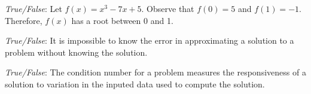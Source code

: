 \documentclass[11pt,letterpaper]{article}
\begin{document}
\thispagestyle{title}


\quizsol \textit{True/False}: Let $f(x)= x^3 - 7x + 5$. Observe that $f(0)= 5$ and $f(1)= -1$. Therefore, $f(x)$ has a root between 0 and 1. \pspace

\sol 


\quizsol \textit{True/False}: It is impossible to know the error in approximating a solution to a problem without knowing the solution. \pspace


\quizsol \textit{True/False}: The condition number for a problem measures the responsiveness of a solution to variation in the inputed data used to compute the solution. \pspace
\end{document}
